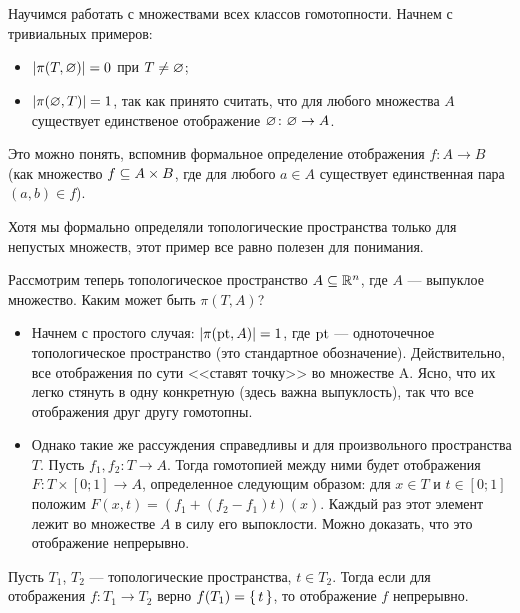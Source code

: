 \documentclass[main]{subfiles}
\begin{document}

\section{}

Научимся работать с множествами всех классов гомотопности. Начнем с тривиальных примеров:
\begin{itemize}
	\item $ \left\vert\pi(T, \varnothing)\right\vert = 0 $ при $ T \neq \varnothing $;
	\item $ \left\vert\pi(\varnothing, T)\right\vert = 1 $, так как принято считать, что для любого множества $ A $ существует
		единственое отображение $ \varnothing \colon \varnothing \to A $.
\end{itemize}
Это можно понять, вспомнив формальное определение отображения $ f \colon A \to B $
(как множество $ f \subseteq A \times B $, где для любого $ a \in A $ существует единственная пара $ (a, b) \in f $).

\begin{remark}
	Хотя мы формально определяли топологические пространства только для непустых множеств, этот пример все равно
	полезен для понимания.
\end{remark}

Рассмотрим теперь топологическое пространство $ A \subseteq \mathbb{R}^n $, где $ A $ --- выпуклое множество.
Каким может быть $ \pi(T, A) $?
\begin{itemize}
	\item Начнем с простого случая: $ \left\vert\pi(\operatorname{pt}, A)\right\vert = 1 $, где $ \operatorname{pt} $ --- одноточечное топологическое пространство
		(это стандартное обозначение). Действительно, все отображения по сути <<ставят точку>>
		во множестве A. Ясно, что их легко стянуть в одну конкретную (здесь важна выпуклость), так что все отображения
		друг другу гомотопны.
	\item Однако такие же рассуждения справедливы и для произвольного пространства $ T $. Пусть
		$ f_1, f_2 \colon T \to A $. Тогда гомотопией между ними будет отображения
		$ F \colon T \times [0; 1] \to A $, определенное следующим образом: для $ x \in T $ и
		$ t \in [0; 1] $ положим $ F(x, t) = (f_1 + (f_2 - f_1) t)(x) $. Каждый раз этот элемент лежит
		во множестве $ A $ в силу его выпоклости. Можно доказать, что это отображение непрерывно.
\end{itemize}

\begin{theorem}
	Пусть $ T_1 $, $ T_2 $ --- топологические пространства, $ t \in T_2 $. Тогда если для отображения
	$ f \colon T_1 \to T_2 $ верно $ f(T_1) = \left\{\,t\,\right\} $, то отображение $ f $ непрерывно.
\end{theorem}
\end{document}

